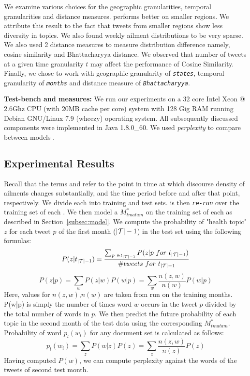 We examine various choices for the geographic granularities, temporal
granularities and distance measures. \tmatam performs better on
smaller regions. We attribute this
result to the fact that tweets from smaller regions show less diversity in topics. We also found weekly ailment distributions to be very sparse. We also used 2 distance measures to measure distribution difference
namely, cosine similarity and Bhattacharyya distance. We observed that
number of tweets at a given time granularity $t$ may affect the
performance of Cosine Similarity. Finally, we chose to work with geographic granularity of \texttt{\emph{states}}, temporal granularity of \texttt{\emph{months}} and distance measure of \texttt{\emph{Bhattacharyya}}.

{\bf Test-bench and measures:} We run our experiments on a {32 core Intel Xeon @ 2.6Ghz CPU 
(with 20MB cache per core)} system with {128 Gig} RAM running 
{Debian GNU/Linux 7.9 (wheezy)} operating system.
All subsequently discussed components were implemented in 
Java {1.8.0\_60}. 
We used \emph{perplexity} to compare between models \cite{Wallach:2009:EMT:1553374.1553515}.
\subsection{Experimental Results}
Recall that the terms \change and \season refer to the point in time at which discourse density of ailments changes substantially, and the time period before and after that point, respectively. We  divide each \season into training and test sets. \atam is then \emph{\texttt{re-run}} over the training set of each \season. We then model a \transition  \emph{\texttt{$M_{tmatam}^*$}} on the training set of each \season as described in Section~\ref{subsec:model}. We compute the probability of "health topic" $z$ for each tweet $p$ of the first month ($|\mathcal{T}|-1$) in the test set using the following formulas:
\begin{equation}
\label{eq:probabilitytopicgiventimepost}
P(z|t_{|\mf T|-1}) = \frac{\sum_{p\ \in t_{|\mf T|-1}}P(z|p\ for\ t_{|\mf T|-1} )}
    {\# tweets\ for\ t_{|\mf T|-1}}
\end{equation}
\begin{equation}
P(z|p)=\sum_{w}P(z|w)P(w|p) = \sum_{w}\frac{n(z,w)}{n(w)}P(w|p)
\end{equation}
Here, values for $n(z,w)$,$n(w)$ are taken from \atam run on the training months. P(w|p) is simply the number of times word $w$ occurs in the tweet $p$ divided by the total number of words in $p$.
We then predict the future probability of each topic in the second month of the test data using the corresponding \transition $M_{tmatam}^*$. Probability of word $p_l(w_i)$ for any document set is calculated as follows:
\begin{equation}
\label{eq:probabilityword}
p_l(w_i)=\sum_{z}P(w|z)P(z) = \sum_{z}\frac{n(z,w)}{n(z)}P(z)
\end{equation}
Having computed $P(w)$, we can compute perplexity against the words of the tweets of second test month.

